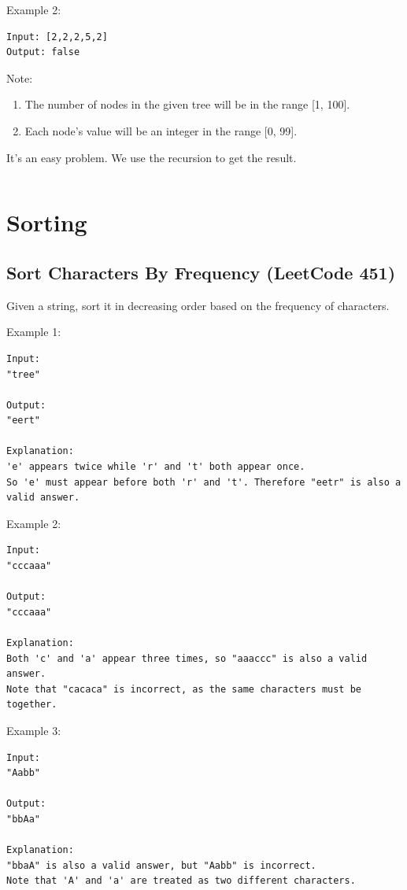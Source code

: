 \documentclass[11pt]{article}
\begin{document}
Example 2:
\begin{verbatim}
Input: [2,2,2,5,2]
Output: false
\end{verbatim}

Note:
\begin{enumerate}
	\item The number of nodes in the given tree will be in the range [1, 100].
	\item Each node's value will be an integer in the range [0, 99].
\end{enumerate}

It's an easy problem. 
We use the recursion to get the result.
\inputminted[breaklines=true,frame=leftline, linenos=true]{python}{src/isUnivalTree.py}


\section{Sorting}
\subsection{Sort Characters By Frequency (LeetCode 451)}
Given a string, sort it in decreasing order based on the frequency of characters.

Example 1:
\begin{verbatim}
Input:
"tree"

Output:
"eert"

Explanation:
'e' appears twice while 'r' and 't' both appear once.
So 'e' must appear before both 'r' and 't'. Therefore "eetr" is also a valid answer.
\end{verbatim}


Example 2:
\begin{verbatim}
Input:
"cccaaa"

Output:
"cccaaa"

Explanation:
Both 'c' and 'a' appear three times, so "aaaccc" is also a valid answer.
Note that "cacaca" is incorrect, as the same characters must be together.
\end{verbatim}


Example 3:
\begin{verbatim}
Input:
"Aabb"

Output:
"bbAa"

Explanation:
"bbaA" is also a valid answer, but "Aabb" is incorrect.
Note that 'A' and 'a' are treated as two different characters.
\end{verbatim}
\end{document}
